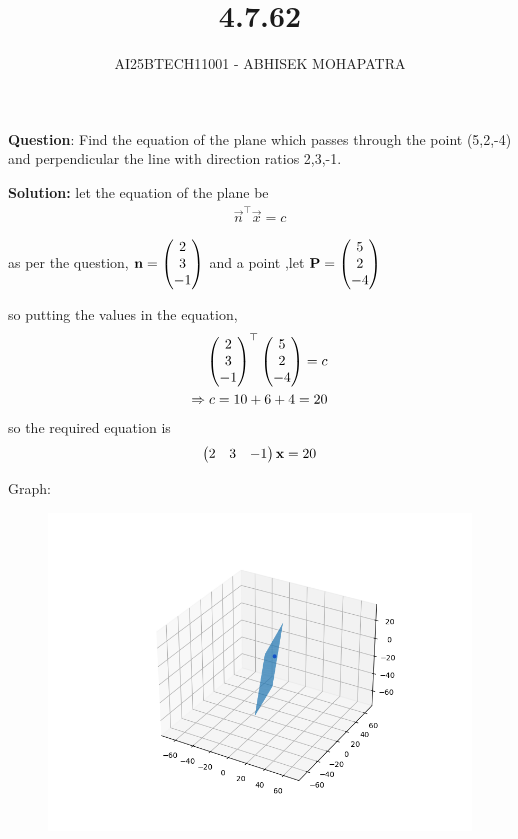 \documentclass{beamer}
\title{4.7.62}
\author{AI25BTECH11001 - ABHISEK MOHAPATRA}
\numberwithin{equation}{section}
\begin{document}
{\let\newpage\relax\maketitle}
\renewcommand{\thefigure}{\theenumi}
\renewcommand{\thetable}{\theenumi}


	 	\textbf{Question}:
Find the equation of the plane which passes through the point (5,2,-4) and perpendicular the line with direction ratios 2,3,-1.


		\textbf{Solution:} let the equation of the plane be 
\begin{align}
		\vec{n}^\top\vec{x} = c
\end{align}

as per the question, $\mathbf{n} = \begin{pmatrix}2\\3\\-1\end{pmatrix}$ and a point ,let $\mathbf{P} = \begin{pmatrix}5\\2\\-4\end{pmatrix}$ 

so putting the values in the equation,
\begin{align}
		\begin{pmatrix}2\\3\\-1\end{pmatrix}^\top\begin{pmatrix}5\\2\\-4\end{pmatrix} = c\\
		\Rightarrow c = 10 + 6 +4 = 20
\end{align}
so the required equation is
\begin{align}
		\begin{pmatrix}2&3&-1\end{pmatrix}\mathbf{x} = 20
\end{align}

Graph:
\begin{figure}[h!]
	\centering
	\includegraphics[width=0.7\linewidth]{img.png}
\end{figure}
\end{document}
